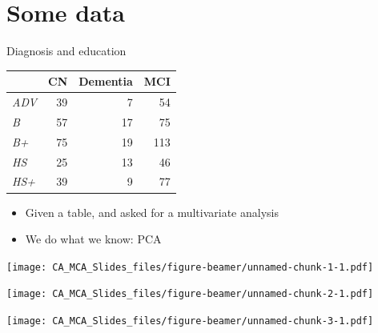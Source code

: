 \documentclass[
  ignorenonframetext,
]{beamer}
\providecommand{\tightlist}{%
  \setlength{\itemsep}{0pt}\setlength{\parskip}{0pt}}
\begin{document}
\hypertarget{some-data}{%
\section{Some data}\label{some-data}}

\begin{frame}{Diagnosis and education}
\protect\hypertarget{diagnosis-and-education}{}

\begin{table}[H]
\centering
\begin{tabular}{>{\em}lrrr}
\toprule
  & CN & Dementia & MCI\\
\midrule
ADV & 39 & 7 & 54\\
B & 57 & 17 & 75\\
B+ & 75 & 19 & 113\\
HS & 25 & 13 & 46\\
HS+ & 39 & 9 & 77\\
\bottomrule
\end{tabular}
\end{table}

\end{frame}

\begin{frame}

\begin{itemize}[<+->]
\tightlist
\item
  Given a table, and asked for a multivariate analysis
\item
  We do what we know: PCA
\end{itemize}

\end{frame}

\begin{frame}

\end{frame}

\begin{frame}

\texttt{[image: CA\_MCA\_Slides\_files/figure-beamer/unnamed-chunk-1-1.pdf]}

\end{frame}

\begin{frame}

\texttt{[image: CA\_MCA\_Slides\_files/figure-beamer/unnamed-chunk-2-1.pdf]}

\end{frame}

\begin{frame}

\texttt{[image: CA\_MCA\_Slides\_files/figure-beamer/unnamed-chunk-3-1.pdf]}

\end{frame}
\end{document}

